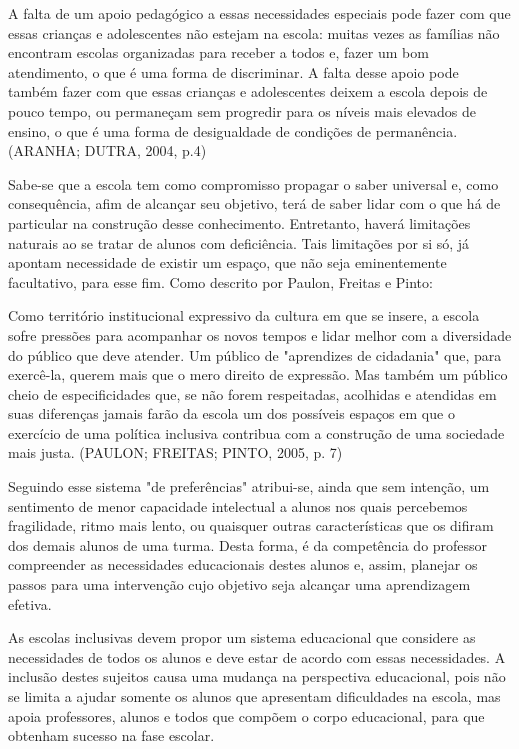 \documentclass[brasil]{abnt}
\begin{document}
		\begin{citacao} A falta de um apoio pedagógico a essas necessidades especiais pode fazer com que essas crianças e adolescentes não estejam na escola: muitas vezes as famílias não encontram escolas 
						organizadas para receber a todos e, fazer um bom atendimento, o que é uma forma de discriminar. A falta desse apoio pode também fazer com que essas crianças e adolescentes deixem a 
						escola depois de pouco tempo, ou permaneçam sem progredir para os níveis mais elevados de ensino, o que é uma forma de desigualdade de condições de permanência. 
						(ARANHA; DUTRA, 2004, p.4)
		\end{citacao}

	Sabe-se que a escola tem como compromisso propagar o saber universal e, como consequência, afim de alcançar seu objetivo, terá de saber lidar com o que há de particular na construção desse conhecimento. 
	Entretanto, haverá limitações naturais ao se tratar de alunos com deficiência. Tais limitações por si só, já apontam necessidade de existir um espaço, que não seja eminentemente facultativo, para esse fim.
	Como descrito por Paulon, Freitas e Pinto:
		
		\begin{citacao}Como território institucional expressivo da cultura em que se insere, a escola sofre pressões para acompanhar os novos tempos e lidar melhor com a diversidade do público que deve atender. 
						Um público de "aprendizes de cidadania" que, para exercê-la, querem mais que o mero direito de expressão. Mas também um público cheio de especificidades que, se não forem respeitadas, 
						acolhidas e atendidas em suas diferenças jamais farão da escola um dos possíveis espaços em que o exercício de uma política inclusiva contribua com a construção de uma sociedade mais 
						justa. (PAULON; FREITAS; PINTO, 2005, p. 7)
		\end{citacao}
	
	
	Seguindo esse sistema "de preferências" atribui-se, ainda que sem intenção, um sentimento de menor capacidade intelectual a alunos nos quais percebemos fragilidade, ritmo mais lento, 
	ou quaisquer outras características que os difiram dos demais alunos de uma turma. 
	Desta forma, é da competência do professor compreender as necessidades educacionais destes alunos e, assim, planejar os passos para uma intervenção cujo objetivo seja 
	alcançar uma aprendizagem efetiva.
	
	As escolas inclusivas devem propor um sistema educacional que considere as necessidades de todos os alunos e 
	deve estar de acordo com essas necessidades. 
 	A inclusão destes sujeitos causa uma mudança na perspectiva educacional, pois não se limita a ajudar somente os alunos que apresentam dificuldades na escola, mas apoia professores,
 	alunos e todos que compõem o corpo educacional, para que obtenham sucesso na fase escolar. 
		
\end{document}
